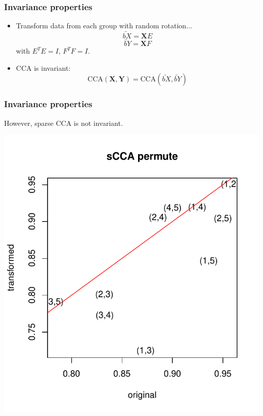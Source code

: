 \documentclass{beamer}
\newcommand{\bX}{\boldsymbol{X}}
\newcommand{\bY}{\boldsymbol{Y}}
\begin{document}

\begin{frame}
\frametitle{Invariance properties}
\begin{itemize}
\item Transform data from each group with random rotation...
\[\tilde{bX} = \bX E\]
\[\tilde{bY} = \bX F\]
with $E^T E = I$, $F^T F = I$.\pause
\item CCA is invariant:
\[
\text{CCA}(\bX, \bY) = \text{CCA}(\tilde{bX},\tilde{bY})
\]
\pause
\end{itemize}
\end{frame}

\begin{frame}
\frametitle{Invariance properties}
However, sparse CCA is not invariant.

\begin{center}
\includegraphics[scale = 0.5]{../idloss/cca_p_robustness.pdf}
\end{center}
\end{frame}
\end{document}
